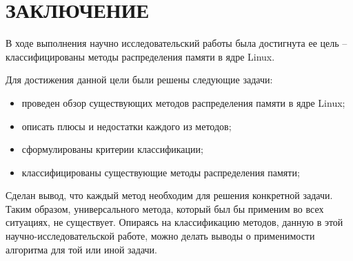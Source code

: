 \section*{ЗАКЛЮЧЕНИЕ}

В ходе выполнения научно исследовательский работы была достигнута ее цель --  классифицированы методы распределения памяти в ядре Linux.

Для достижения данной цели были решены следующие задачи:

\begin{itemize}
	\item проведен обзор существующих методов распределения памяти в ядре Linux;
	\item описать плюсы и недостатки каждого из методов;
	\item сформулированы критерии классификации;
	\item классифицированы существующие методы распределения памяти;
\end{itemize}

Сделан вывод, что каждый метод необходим для решения конкретной задачи. Таким образом, универсального метода, который был бы применим во всех ситуациях, не существует. Опираясь на классификацию методов, данную в этой научно-исследовательской работе, можно делать выводы о применимости алгоритма для той или иной задачи.

\pagebreak